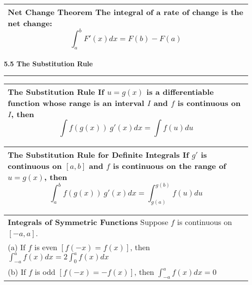 \documentclass[fleqn]{article}
\begin{document}
\begin{center}
\large
\def\arraystretch{1.3}
{\setlength{\tabcolsep}{16pt}
\begin{tabularx}{.9\textwidth}{|X|}
\hline
	\vspace{1pt}
	\textbf{Net Change Theorem} \: The integral of a rate of change is the net change:
	$$\int_a^b F'(x)dx = F(b)-F(a)$$\\
\hline
\end{tabularx}}
\vspace{12pt}
\pagebreak

\Large\textbf{5.5 The Substitution Rule}

\noindent\hfill\rule{0.3\textwidth}{.4pt}\hfill
\vspace{12pt}
\large

\def\arraystretch{1.3}
{\setlength{\tabcolsep}{16pt}
\begin{tabularx}{.9\textwidth}{|X|}
\hline
	\vspace{1pt}
	\textbf{The Substitution Rule} \: If $u = g(x)$ is a differentiable function whose range is an interval $I$ and $f$ is continuous on $I$, then
	$$\int f(g(x)) \: g'(x)dx = \int f(u)du$$\\
\hline
\end{tabularx}}
\vspace{12pt}

\def\arraystretch{1.3}
{\setlength{\tabcolsep}{16pt}
\begin{tabularx}{.9\textwidth}{|X|}
\hline
	\vspace{1pt}
	\textbf{The Substitution Rule for Definite Integrals} \: If $g'$ is continuous on $[a,b]$ and $f$ is continuous on the range of $u = g(x)$, then
	$$ \int_a^b f(g(x)) \: g'(x) dx = \int_{g(a)}^{g(b)} f(u) du$$\\
\hline
\end{tabularx}}
\vspace{12pt}

\def\arraystretch{1.3}
{\setlength{\tabcolsep}{16pt}
\begin{tabularx}{.9\textwidth}{|X|}
\hline
	\vspace{1pt}
	\textbf{Integrals of Symmetric Functions} \: Suppose $f$ is continuous on $[-a,a]$.\\[5pt]
	(a) \:\:\: If $f$ is even $[f(-x) = f(x)]$, then $\int_{-a}^a f(x) dx = 2 \int_0^a f(x) dx$\\[5pt]
	(b) \:\:\: If $f$ is odd $[f(-x) = -f(x)]$, then $\int_{-a}^a f(x) dx = 0$\\[14pt]
\hline
\end{tabularx}}
\vspace{12pt}

\end{center}
\end{document}
